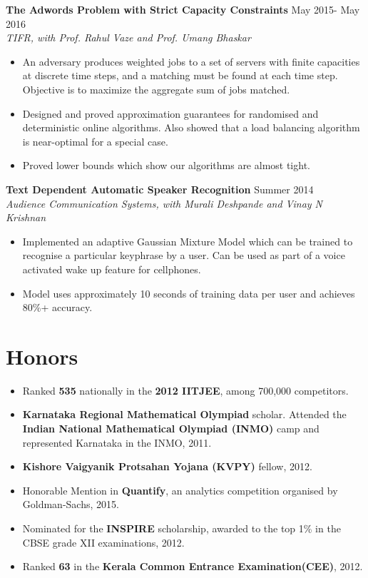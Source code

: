 \documentclass[margin, 11pt]{res} %
\begin{document}
\begin{resume}
{\bf The Adwords Problem with Strict Capacity Constraints} \hfill May 2015- May 2016\\
{\sl TIFR, with Prof. Rahul Vaze and Prof. Umang Bhaskar}
\begin{itemize}\itemsep -2pt
	\item An adversary produces weighted jobs to a set of servers with finite capacities at discrete	time steps, and a matching must be found at each time step. Objective is to maximize the aggregate sum of jobs matched.
	\item Designed and proved approximation guarantees for randomised and deterministic online algorithms. Also showed that a load balancing algorithm is near-optimal for a special case.
	\item Proved lower bounds which show our algorithms are almost tight.
\end{itemize}

{\bf Text Dependent Automatic Speaker Recognition} \hfill Summer 2014\\
{\sl Audience Communication Systems, with Murali Deshpande and Vinay N Krishnan}
\begin{itemize}\itemsep -2pt
\item Implemented an adaptive Gaussian Mixture Model which can be trained to recognise a particular
keyphrase by a 	user. Can be used as part of a voice activated wake up feature for
cellphones.
\item Model uses approximately 10 seconds of training data per user and achieves 80\%+ accuracy.
\end{itemize}


\section{\large Honors}
\begin{itemize}\itemsep -2pt
	\item Ranked {\bf 535} nationally in the {\bf 2012 IITJEE}, among 700,000 competitors.
	\item {\bf Karnataka Regional Mathematical Olympiad} scholar. Attended the {\bf Indian National Mathematical Olympiad (INMO)} camp and represented Karnataka
	in the INMO, 2011.
	\item {\bf Kishore Vaigyanik Protsahan Yojana (KVPY)} fellow, 2012.
	\item Honorable Mention in {\bf Quantify}, an analytics competition organised by Goldman-Sachs,
	2015.
	\item Nominated for the {\bf INSPIRE} scholarship, awarded to the top 1\% in the CBSE grade XII
	examinations, 2012.
	\item Ranked {\bf 63} in the {\bf Kerala Common Entrance Examination(CEE)}, 2012.
\end{itemize}


\end{resume}
\end{document}
